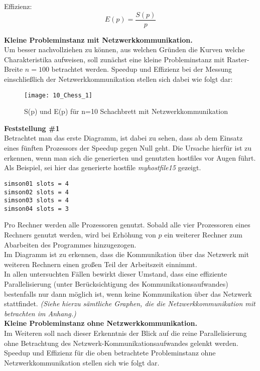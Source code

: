 \documentclass[
10pt, %
a4paper, %
oneside, %
headinclude,footinclude, %
BCOR5mm, %
]{scrartcl}
\begin{document}
Effizienz:
\begin{equation}
E(p)=\frac{S(p)}{p}
\end{equation}

\textbf{Kleine Probleminstanz mit Netzwerkkommunikation.}\\
Um besser nachvollziehen zu können, aus welchen Gründen die Kurven welche Charakteristika aufweisen, soll zunächst eine kleine Probleminstanz mit Raster-Breite \(n=100\) betrachtet werden. Speedup und Effizienz bei der Messung einschließlich der Netzwerkkommunikation stellen sich dabei wie folgt dar:\\

\begin{figure}[h]
	\centering 
	\texttt{[image: 10\_Chess\_1]} 
	\caption[S(p) und E(p) für n=10 Schachbrett mit Netzwerkkomm.]{S(p) und E(p) für n=10 Schachbrett mit Netzwerkkommunikation}
\end{figure}

\textbf{Feststellung \#1}\\
Betrachtet man das erste Diagramm, ist dabei zu sehen, dass ab dem Einsatz eines fünften Prozessors der Speedup gegen Null geht. Die Ursache hierfür ist zu erkennen, wenn man sich die generierten und genutzten hostfiles vor Augen führt. Als Beispiel, sei hier das generierte hostfile \textit{myhostfile15} gezeigt.\\

\begin{lstlisting}
simson01 slots = 4
simson02 slots = 4
simson03 slots = 4
simson04 slots = 3
\end{lstlisting}

Pro Rechner werden alle Prozessoren genutzt. Sobald alle vier Prozessoren eines Rechners genutzt werden, wird bei Erhöhung von \(p\) ein weiterer Rechner zum Abarbeiten des Programmes hinzugezogen.\\
Im Diagramm ist zu erkennen, dass die Kommunikation über das Netzwerk mit weiteren Rechnern einen großen Teil der Arbeitszeit einnimmt.\\
In allen untersuchten Fällen bewirkt dieser Umstand, dass eine effiziente Parallelisierung (unter Berücksichtigung des Kommunikationsaufwandes) bestenfalls nur dann möglich ist, wenn keine Kommunikation über das Netzwerk stattfindet. \textit{(Siehe hierzu sämtliche Graphen, die die Netzwerkkommunikation mit betrachten im Anhang.)}\\

\textbf{Kleine Probleminstanz ohne Netzwerkkommunikation.}\\
Im Weiteren soll nach dieser Erkenntnis der Blick auf die reine Parallelisierung ohne Betrachtung des Netzwerk-Kommunikationsaufwandes gelenkt werden. Speedup und Effizienz für die oben betrachtete Probleminstanz ohne Netzwerkkommunikation stellen sich wie folgt dar.\\
\end{document}
